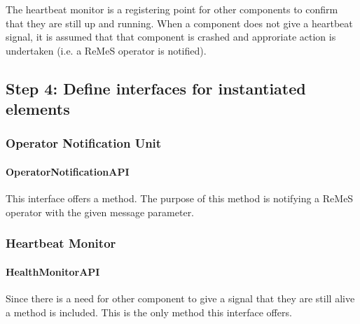 \npar The heartbeat monitor is a registering point for other components to
confirm that they are still up and running. When a component does not give a
heartbeat signal, it is assumed that that component is crashed and approriate
action is undertaken (i.e. a ReMeS operator is notified).

\subsection{Step 4: Define interfaces for instantiated elements}
\label{add:it9/interfaces}

\subsubsection{Operator Notification Unit}

\paragraph{OperatorNotificationAPI}
\npar This interface offers a  method. The
purpose of this method is notifying a ReMeS operator with the given message
parameter. 

\subsubsection{Heartbeat Monitor}

\paragraph{HealthMonitorAPI}
\npar Since there is a need for other component to give a signal that they are
still alive a method  is included. This is the only method this
interface offers.

